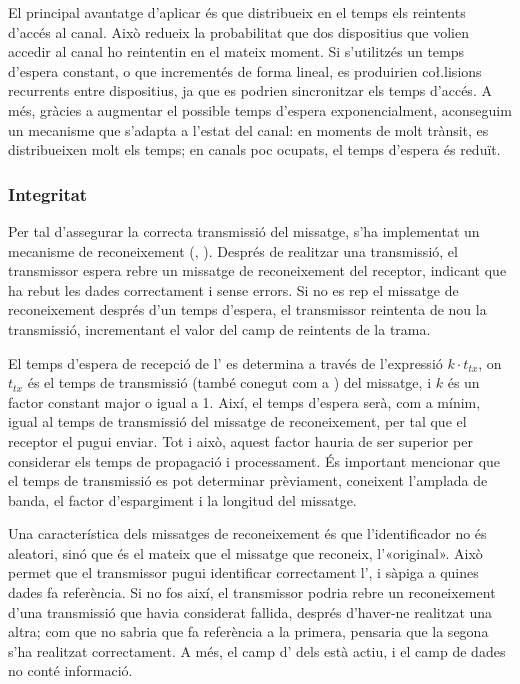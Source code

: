 \documentclass{tfgitic}[2024/07/01]
\begin{document}
El principal avantatge d'aplicar  és que distribueix en el temps els reintents d'accés al canal. Això redueix la probabilitat que dos dispositius que volien accedir al canal ho reintentin en el mateix moment. Si s'utilitzés un temps d'espera constant, o que incrementés de forma lineal, es produirien co\l.lisions recurrents entre dispositius, ja que es podrien sincronitzar els temps d'accés. A més, gràcies a augmentar el possible temps d'espera exponencialment, aconseguim un mecanisme que s'adapta a l'estat del canal: en moments de molt trànsit, es distribueixen molt els temps; en canals poc ocupats, el temps d'espera és reduït.
\subsubsection{Integritat}
\label{subsubsec:integritat}
Per tal d'assegurar la correcta transmissió del missatge, s'ha implementat un mecanisme de reconeixement (, ). Després de realitzar una transmissió, el transmissor espera rebre un missatge de reconeixement del receptor, indicant que ha rebut les dades correctament i sense errors. Si no es rep el missatge de reconeixement després d'un temps d'espera, el transmissor reintenta de nou la transmissió, incrementant el valor del camp de reintents de la trama.

El temps d'espera de recepció de l' es determina a través de l'expressió $k \cdot t_{tx}$, on $t_{tx}$ és el temps de transmissió (també conegut com a ) del missatge, i $k$ és un factor constant major o igual a 1. Així, el temps d'espera serà, com a mínim, igual al temps de transmissió del missatge de reconeixement, per tal que el receptor el pugui enviar. Tot i això, aquest factor hauria de ser superior per considerar els temps de propagació i processament. És important mencionar que el temps de transmissió es pot determinar prèviament, coneixent l'amplada de banda, el factor d'espargiment i la longitud del missatge.

Una característica dels missatges de reconeixement és que l'identificador no és aleatori, sinó que és el mateix que el missatge que reconeix, l'«original». Això permet que el transmissor pugui identificar correctament l', i sàpiga a quines dades fa referència. Si no fos així, el transmissor podria rebre un reconeixement d'una transmissió que havia considerat fallida, després d'haver-ne realitzat una altra; com que no sabria que fa referència a la primera, pensaria que la segona s'ha realitzat correctament. A més, el camp d' dels  està actiu, i el camp de dades no conté informació.
\end{document}
